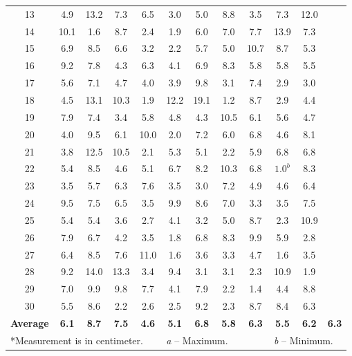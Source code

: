 \begin{table}[!htb]
\begin{tabular}{c c c c c c c c c c c c}
13 & 4.9  & 13.2 & 7.3  & 6.5  & 3.0  & 5.0  & 8.8  & 3.5  & 7.3  & 12.0 \\
14 & 10.1 & 1.6  & 8.7  & 2.4  & 1.9  & 6.0  & 7.0  & 7.7  & 13.9 & 7.3 \\
15 & 6.9  & 8.5  & 6.6  & 3.2  & 2.2  & 5.7  & 5.0  & 10.7 & 8.7  & 5.3 \\
16 & 9.2  & 7.8  & 4.3  & 6.3  & 4.1  & 6.9  & 8.3  & 5.8  & 5.8  & 5.5 \\
17 & 5.6  & 7.1  & 4.7  & 4.0  & 3.9  & 9.8  & 3.1  & 7.4  & 2.9  & 3.0 \\
18 & 4.5  & 13.1 & 10.3 & 1.9  & 12.2 & 19.1 & 1.2  & 8.7  & 2.9  & 4.4 \\
19 & 7.9  & 7.4  & 3.4  & 5.8  & 4.8  & 4.3  & 10.5 & 6.1  & 5.6  & 4.7 \\
20 & 4.0  & 9.5  & 6.1  & 10.0 & 2.0  & 7.2  & 6.0  & 6.8  & 4.6  & 8.1 \\
21 & 3.8  & 12.5 & 10.5 & 2.1  & 5.3  & 5.1  & 2.2  & 5.9  & 6.8  & 6.8 \\
22 & 5.4  & 8.5  & 4.6  & 5.1  & 6.7  & 8.2  & 10.3 & 6.8  & $1.0^b$ & 8.3 \\
23 & 3.5  & 5.7  & 6.3  & 7.6  & 3.5  & 3.0  & 7.2  & 4.9  & 4.6  & 6.4 \\
24 & 9.5  & 7.5  & 6.5  & 3.5  & 9.9  & 8.6  & 7.0  & 3.3  & 3.5  & 7.5 \\
25 & 5.4  & 5.4  & 3.6  & 2.7  & 4.1  & 3.2  & 5.0  & 8.7  & 2.3  & 10.9 \\
26 & 7.9  & 6.7  & 4.2  & 3.5  & 1.8  & 6.8  & 8.3  & 9.9  & 5.9  & 2.8 \\
27 & 6.4  & 8.5  & 7.6  & 11.0 & 1.6  & 3.6  & 3.3  & 4.7  & 1.6  & 3.5 \\
28 & 9.2  & 14.0 & 13.3 & 3.4  & 9.4  & 3.1  & 3.1  & 2.3  & 10.9 & 1.9 \\
29 & 7.0  & 9.9  & 9.8  & 7.7  & 4.1  & 7.9  & 2.2  & 1.4  & 4.4  & 8.8 \\
30      & 5.5  & 8.6  & 2.2  & 2.6  & 2.5  & 9.2  & 2.3  & 8.7  & 8.4  & 6.3 \\
\textbf{Average} & \textbf{6.1} & \textbf{8.7} & \textbf{7.5} & \textbf{4.6} & \textbf{5.1} &
                   \textbf{6.8} & \textbf{5.8} & \textbf{6.3} & \textbf{5.5} & \textbf{6.2} & \textbf{6.3} \\
\bottomrule
 \multicolumn{5}{l}{*Measurement is in centimeter.} &
 \multicolumn{4}{l}{\textit{a} -- Maximum.} &
 \multicolumn{3}{l}{\textit{b} -- Minimum.} \\
\end{tabular}
\end{table}
